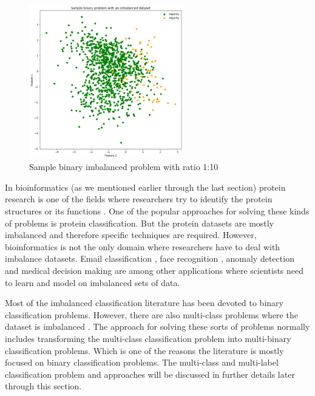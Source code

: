 \begin{figure}[ht]
    \centering
    \includegraphics[width=0.60\textwidth]{figures/07SampleBinaryImbalanced.png}
    \caption{Sample binary imbalanced problem with ratio 1:10}
    \label{fig:sampleBinaryImbalanced}
\end{figure}

In bioinformatics (as we mentioned earlier through the last section) protein research is one of the 
fields where researchers try to identify the protein structures or its functions 
\cite{mishra_prediction_2014,lesh_complete_2003}. One of the popular approaches for solving 
these kinds of problems is protein classification. But the protein datasets are mostly imbalanced 
and therefore specific techniques are required. However, bioinformatics is not the only domain 
where researchers have to deal with imbalance datasets. Email classification \cite{bermejo_improving_2011}, 
face recognition \cite{yi-hung_liu_total_2005}, anomaly detection \cite{khreich_iterative_2010} and 
medical decision making \cite{mazurowski_training_2008} are among other applications where scientists 
need to learn and model on imbalanced sets of data.

Most of the imbalanced classification literature has been devoted to binary classification problems. 
However, there are also multi-class problems where the dataset is imbalanced 
\cite{mishra_prediction_2014,shuo_wang_multiclass_2012}. The approach for solving these sorts of 
problems normally includes transforming the multi-class classification problem into multi-binary 
classification problems. Which is one of the reasons the literature is mostly focused on binary 
classification problems. The multi-class and multi-label classification problem and approaches 
will be discussed in further details later through this section.

